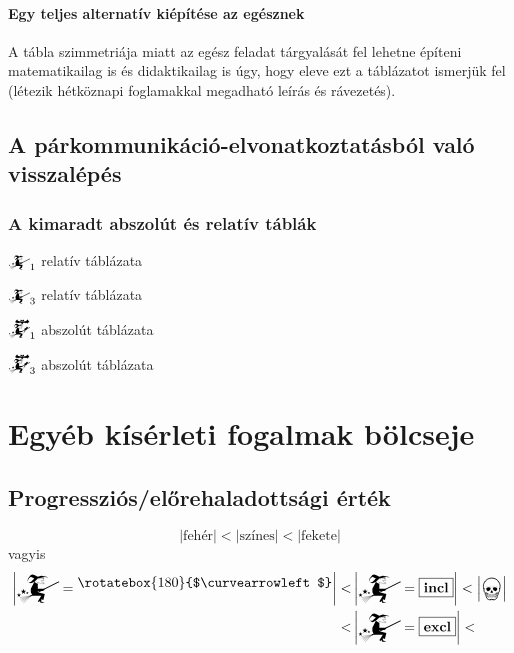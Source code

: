 \documentclass{article}
\newcommand{\nothing}{\text{\raisebox{0.4em}{\rotatebox{180}{$\curvearrowleft$}}}}%
\newcommand{\just}[1]{\boxed{#1}}%
\newcommand{\incl}{\mathbf{incl}}
\newcommand{\excl}{\mathbf{excl}}
\newcommand{\currymainfun}[1]{\mathwitch_{#1}}
\newcommand{\currymainfunabs}[1]{\overbat{\mathwitch*_{#1}}}
\newcommand{\progr}[1]{\left|#1\right|}
\begin{document}
	\paragraph{Egy teljes alternatív kiépítése az egésznek}
	A tábla szimmetriája miatt az egész feladat tárgyalását fel lehetne építeni matematikailag is és didaktikailag is úgy, hogy eleve  ezt a táblázatot ismerjük fel (létezik hétköznapi foglamakkal megadható leírás és rávezetés).

	\subsection{A párkommunikáció-elvonatkoztatásból való visszalépés}

	\subsubsection{A kimaradt abszolút és relatív táblák}

	\begin{table}[H]
		\caption*{$\currymainfun1$ relatív táblázata}
		\centering
	\end{table}

	\begin{table}[H]
		\caption*{$\currymainfun3$ relatív táblázata}
		\centering
	\end{table}

	\begin{table}[H]
		\caption*{$\currymainfunabs1$ abszolút táblázata}
		\centering
	\end{table}

	\begin{table}[H]
		\caption*{$\currymainfunabs3$ abszolút táblázata}
		\centering
	\end{table}

	\section{Egyéb kísérleti fogalmak bölcseje}

	\subsection{Progressziós/előrehaladottsági érték}
	\begin{displaymath}
		\progr{\text{fehér}} < \progr{\text{színes}} < \progr{\text{fekete}}
	\end{displaymath}
	vagyis
	\begin{align*}
		\progr{\mathwitch=\nothing} < &\progr{\mathwitch=\just\incl} < \progr{\bigskull}\\
		                            < &\progr{\mathwitch=\just\excl} <
	\end{align*}
\end{document}

